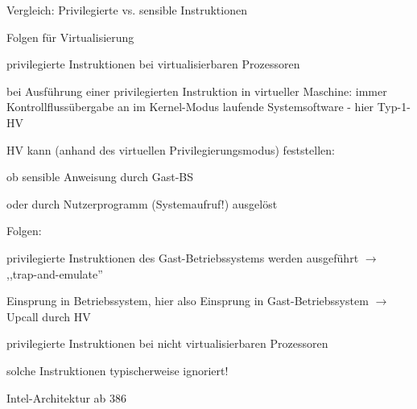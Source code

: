 \documentclass[a4paper]{article}
\begin{document}
\begin{multicols}{3}
    Vergleich: Privilegierte vs. sensible Instruktionen

    \begin{itemize*}
        \item
    \end{itemize*}

    Folgen für Virtualisierung

    \begin{itemize*}
        \item
        privilegierte Instruktionen bei virtualisierbaren Prozessoren
        \item
        bei Ausführung einer privilegierten Instruktion in virtueller
        Maschine: immer Kontrollflussübergabe an im Kernel-Modus laufende
        Systemsoftware - hier Typ-1-HV
        \item
        HV kann (anhand des virtuellen Privilegierungsmodus) feststellen:
        \begin{enumerate*}

            \item ob sensible Anweisung durch Gast-BS
            \item oder durch Nutzerprogramm (Systemaufruf!) ausgelöst
        \end{enumerate*}
        \item
        Folgen:
        \begin{enumerate*}

            \item privilegierte Instruktionen des Gast-Betriebssystems werden ausgeführt $\rightarrow$ ,,trap-and-emulate''
            \item Einsprung in Betriebssystem, hier also Einsprung in Gast-Betriebssystem $\rightarrow$ Upcall durch HV
        \end{enumerate*}
        \item
        privilegierte Instruktionen bei nicht virtualisierbaren Prozessoren
        \begin{itemize*}
            \item solche Instruktionen typischerweise ignoriert!
        \end{itemize*}
    \end{itemize*}

    Intel-Architektur ab 386


\end{multicols}
\end{document}
